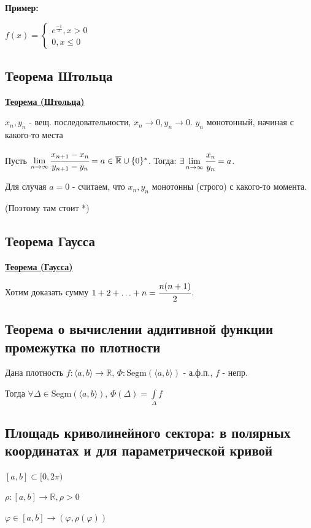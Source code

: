 \documentclass{article}
\newcommand{\integral}[2]{\displaystyle\int\limits_{#1}^{#2}}
\newcommand{\Segm}{\text{Segm}}
\newcommand{\thmm}[1]{\underline{\textbf{#1}}}
\begin{document}
\textbf{Пример:}

$f(x) = \begin{cases}
    e^\frac{-1}{x}, x>0\\
    0,x\leq 0
\end{cases}$

\subsection{Теорема Штольца}

\thmm{Теорема (Штольца)}

$x_n,y_n$ - вещ. последовательности, $x_n \rightarrow 0 , y_n \rightarrow 0$. $y_n$ монотонный, начиная с какого-то места

Пусть $\lim\limits_{n\rightarrow \infty} \cfrac{x_{n+1}-x_n}{y_{n+1}-y_n} =  a\in \overline{\mathbb{R}}\cup \{0\}^*$. Тогда: $\exists \lim\limits_{n \rightarrow\infty}\cfrac{x_n}{y_n} = a$.

Для случая $a = 0$ - считаем, что $x_n, y_n$ монотонны (строго) с какого-то момента. 

(Поэтому там стоит *)




\subsection{Теорема Гаусса}

\thmm{Теорема (Гаусса)}

Хотим доказать сумму $1 + 2 + \ldots + n = \cfrac{n(n+1)}{2}$.

\subsection{Теорема о вычислении аддитивной функции промежутка по плотности}

Дана плотность
$f:\langle a,b\rangle \rightarrow \mathbb{R}$, $\varPhi: \Segm(\langle a,b\rangle)$ - а.ф.п., $f$ - непр.

Тогда $\forall \Delta \in \Segm(\langle a,b\rangle) $, $\varPhi(\Delta) = \integral{\Delta}{}f$

\subsection{Площадь криволинейного сектора: в полярных координатах и для параметрической кривой}
$[a,b] \subset [0,2\pi)$

$\rho:[a,b]\rightarrow \mathbb{R}, \rho>0$

$\varphi \in [a,b] \rightarrow (\varphi,\rho(\varphi))$
\end{document}
